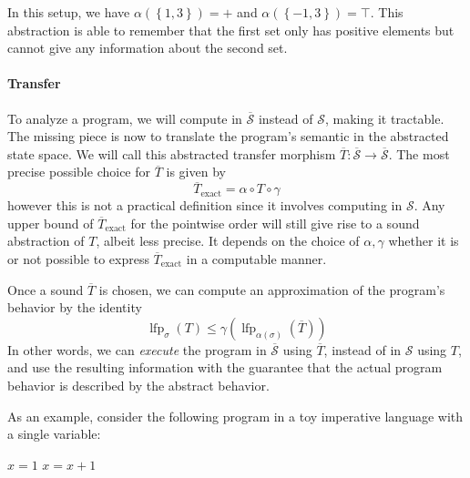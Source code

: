 \documentclass[11pt]{article}
\renewcommand{\S}{\mathcal{S}}
\newcommand{\oS}{\overline{\mathcal{S}}}
\DeclareMathOperator{\lfp}{lfp}
\begin{document}
\hfill

In this setup, we have $\alpha(\left\{1,3\right\}) = +$ and $\alpha(\left\{-1,3\right\}) = \top$. This abstraction is able to remember that the first set only has positive elements but cannot give any information about the second set.

\paragraph{Transfer} To analyze a program, we will compute in $\oS$ instead of $\S$, making it tractable. The missing piece is now to translate the program's semantic in the abstracted state space. We will call this abstracted transfer morphism $\overline{T}:\oS\to\oS$. The most precise possible choice for $\overline{T}$ is given by
\[ \overline{T}_{\text{exact}} = \alpha\circ T\circ \gamma \]
however this is not a practical definition since it involves computing in $\S$. Any upper bound of $\overline{T}_{\text{exact}}$ for the pointwise order will still give rise to a sound abstraction of $T$, albeit less precise. It depends on the choice of $\alpha,\gamma$ whether it is or not possible to express $\overline{T}_{\text{exact}}$ in a computable manner.

Once a sound $\overline{T}$ is chosen, we can compute an approximation of the program's behavior by the identity
\[ \lfp_\sigma(T) \leq \gamma(\lfp_{\alpha(\sigma)}(\overline{T})) \]
In other words, we can \emph{execute} the program in $\oS$ using $\overline{T}$, instead of in $\S$ using $T$, and use the resulting information with the guarantee that the actual program behavior is described by the abstract behavior.

As an example, consider the following program in a toy imperative language with a single variable:

\begin{algorithmic}[1]
\State $x = 1$
\State $x = x+1$
\EndWhile
\end{algorithmic}
\end{document}
